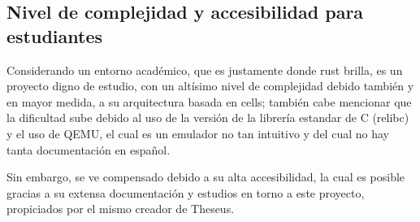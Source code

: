 \subsection{Nivel de complejidad y accesibilidad para estudiantes}
Considerando un entorno académico, que es justamente donde rust brilla, es un proyecto digno de estudio,
con un altísimo nivel de complejidad debido también y en mayor medida, a su arquitectura basada en cells; también cabe mencionar que
la dificultad sube debido al uso de la versión de la librería estandar de C (relibc) y el uso de QEMU, el cual es un emulador no tan intuitivo y del cual no hay tanta documentación en español.

Sin embargo, se ve compensado debido a su alta accesibilidad, la cual es posible gracias a su extensa documentación 
y estudios en torno a este proyecto, propiciados por el mismo creador de Theseus.  